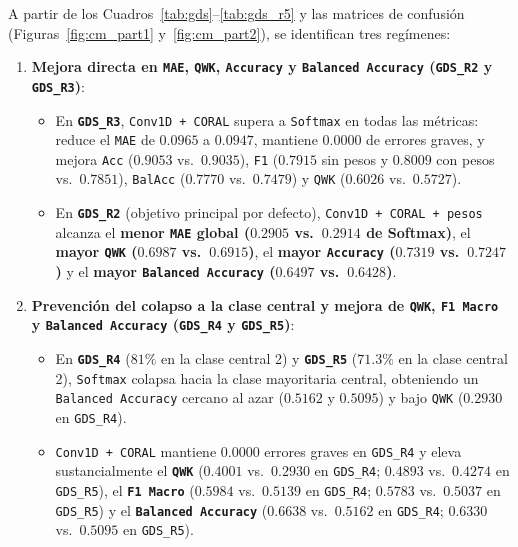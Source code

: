\documentclass[11pt,a4paper]{article}
\begin{document}
A partir de los Cuadros~\ref{tab:gds}--\ref{tab:gds_r5} y las matrices de confusi\'on (Figuras~\ref{fig:cm_part1} y~\ref{fig:cm_part2}), se identifican tres reg\'imenes:
\begin{enumerate}
    \item \textbf{Mejora directa en \texttt{MAE}, \texttt{QWK}, \texttt{Accuracy} y \texttt{Balanced Accuracy} (\texttt{GDS\_R2} y \texttt{GDS\_R3})}:
    \begin{itemize}
        \item En \textbf{\texttt{GDS\_R3}}, \texttt{Conv1D + CORAL} supera a \texttt{Softmax} en todas las m\'etricas: reduce el \texttt{MAE} de $0.0965$ a $\mathbf{0.0947}$, mantiene $\mathbf{0.0000}$ de errores graves, y mejora \texttt{Acc} ($0.9053$ vs.\ $0.9035$), \texttt{F1} ($0.7915$ sin pesos y $\mathbf{0.8009}$ con pesos vs.\ $0.7851$), \texttt{BalAcc} ($\mathbf{0.7770}$ vs.\ $0.7479$) y \texttt{QWK} ($\mathbf{0.6026}$ vs.\ $0.5727$).
        \item En \textbf{\texttt{GDS\_R2}} (objetivo principal por defecto), \texttt{Conv1D + CORAL + pesos} alcanza el \textbf{menor \texttt{MAE} global ($\mathbf{0.2905}$ vs.\ $0.2914$ de Softmax)}, el \textbf{mayor \texttt{QWK} ($\mathbf{0.6987}$ vs.\ $0.6915$)}, el \textbf{mayor \texttt{Accuracy} ($\mathbf{0.7319}$ vs.\ $0.7247$)} y el \textbf{mayor \texttt{Balanced Accuracy} ($\mathbf{0.6497}$ vs.\ $0.6428$)}.
    \end{itemize}
    \item \textbf{Prevenci\'on del colapso a la clase central y mejora de \texttt{QWK}, \texttt{F1 Macro} y \texttt{Balanced Accuracy} (\texttt{GDS\_R4} y \texttt{GDS\_R5})}:
    \begin{itemize}
        \item En \textbf{\texttt{GDS\_R4}} ($81\%$ en la clase central 2) y \textbf{\texttt{GDS\_R5}} ($71.3\%$ en la clase central 2), \texttt{Softmax} colapsa hacia la clase mayoritaria central, obteniendo un \texttt{Balanced Accuracy} cercano al azar ($0.5162$ y $0.5095$) y bajo \texttt{QWK} ($0.2930$ en \texttt{GDS\_R4}).
        \item \texttt{Conv1D + CORAL} mantiene $\mathbf{0.0000}$ errores graves en \texttt{GDS\_R4} y eleva sustancialmente el \textbf{\texttt{QWK}} ($0.4001$ vs.\ $0.2930$ en \texttt{GDS\_R4}; $0.4893$ vs.\ $0.4274$ en \texttt{GDS\_R5}), el \textbf{\texttt{F1 Macro}} ($0.5984$ vs.\ $0.5139$ en \texttt{GDS\_R4}; $0.5783$ vs.\ $0.5037$ en \texttt{GDS\_R5}) y el \textbf{\texttt{Balanced Accuracy}} ($0.6638$ vs.\ $0.5162$ en \texttt{GDS\_R4}; $0.6330$ vs.\ $0.5095$ en \texttt{GDS\_R5}).

\end{itemize}
\end{enumerate}
\end{document}
